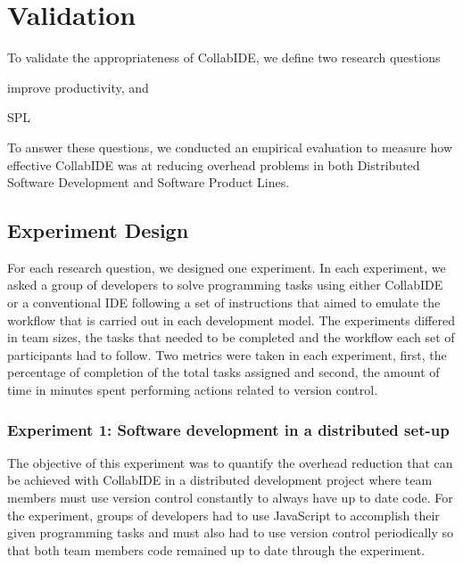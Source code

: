 

\section{Validation}
\label{sec:validation}

To validate the appropriateness of CollabIDE, we define two research questions
\begin{enumerate*}[label=(\arabic*)]
\item improve productivity, and
\item SPL
\end{enumerate*} 
To answer these questions, we conducted an empirical evaluation 
to measure how effective CollabIDE was at reducing overhead problems 
in both Distributed Software Development and Software Product Lines.

\subsection{Experiment Design}


For each research question, we designed one experiment. In each experiment, we asked 
a group of developers to solve programming tasks using either CollabIDE or a 
conventional IDE following a set of instructions that aimed to emulate the workflow that is carried out in each development model. The experiments differed in team sizes, the tasks that needed to be completed and the workflow each set of participants had to follow. Two metrics were taken in each experiment, first, the percentage of completion of the total tasks assigned and second, the amount of time in minutes spent performing actions related to version control.

\subsubsection{Experiment 1: Software development in a distributed set-up}
The objective of this experiment was to quantify the overhead reduction that can be achieved with CollabIDE in a distributed development project where team members must use version control constantly to always have up to date code. 
For the experiment, groups of developers had to use JavaScript to accomplish their given programming tasks and must also had to use version control periodically so that both team members code remained up to date through the experiment. 



